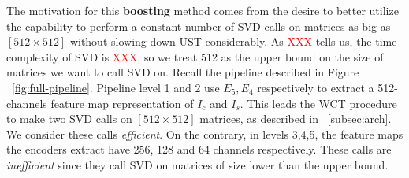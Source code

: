 The motivation for this \textbf{boosting} method comes from the desire to better utilize the capability to perform a constant number of SVD calls on matrices as big as $[512\times 512]$ without slowing down UST considerably. As \textcolor{red}{XXX} tells us, the time complexity of SVD is \textcolor{red}{XXX}, so we treat 512 as the upper bound on the size of matrices we want to call SVD on. Recall the pipeline described in Figure ~\ref{fig:full-pipeline}. Pipeline level 1 and 2 use $E_5, E_4$ respectively to extract a 512-channels feature map representation of $I_c$ and $I_s$. This leads the WCT procedure to make two SVD calls on $[512\times 512]$ matrices, as described in ~\ref{subsec:arch}. We consider these calls \textit{efficient}. On the contrary, in levels 3,4,5, the feature maps the encoders extract have 256, 128 and 64 channels respectively. These calls are \textit{inefficient} since they call SVD on matrices of size lower than the upper bound.\\

